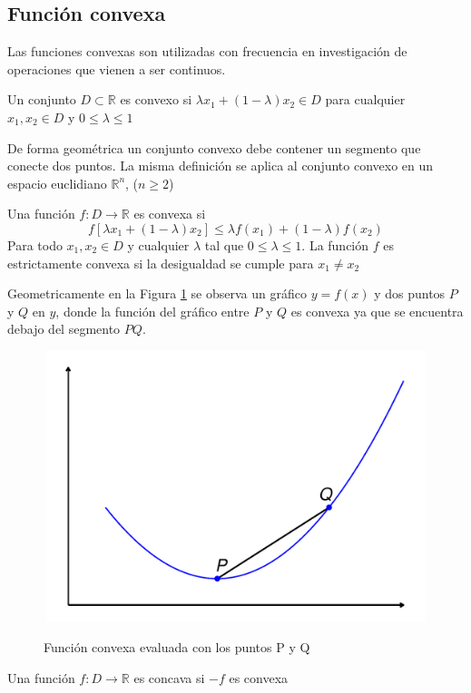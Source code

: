 \subsection{Función convexa}
Las funciones convexas son utilizadas con frecuencia en investigación de operaciones que vienen a ser continuos. \citep{Khuri_2002} 
\begin{definition}
	Un conjunto $D \subset \mathbb{R}$ es convexo si $\lambda {x}_{1}+(1-\lambda){x}_{2} \in D$ para cualquier ${x}_{1},{x}_{2} \in D$ y $0 \leq \lambda \leq 1$
\end{definition}
De forma geométrica un conjunto convexo debe contener un segmento que conecte dos puntos. La misma definición se aplica al conjunto convexo en un espacio euclidiano $\mathbb{R}^n$, ($n \geq 2$)
\begin{definition}
	Una función $f: D \rightarrow \mathbb{R}$ es convexa si
	$$
	f[ \lambda {x}_{1} + (1 - \lambda) {x}_{2} ] \leq \lambda f({x}_{1}) + (1 - \lambda)f({x}_{2})
	$$
	Para todo ${x}_{1}, {x}_{2} \in D$ y cualquier $\lambda$ tal que $0 \leq \lambda \leq 1$. La función $f$ es estrictamente convexa si la desigualdad se cumple para ${x}_{1} \neq {x}_{2}$
\end{definition}
Geometricamente en la Figura \ref{fig:convexo} se observa un gráfico $y = f(x)$ y dos puntos $P$ y $Q$ en $y$, donde la función del gráfico entre $P$ y $Q$ es convexa ya que se encuentra debajo del segmento $PQ$.
\begin{figure}[H]
  \caption{Función convexa evaluada con los puntos P y Q}
  {\includegraphics[width=15cm, height=7.9cm]{images/convexo.pdf}}
  \label{fig:convexo}
\end{figure}

\begin{definition}
	Una función $f: D \rightarrow \mathbb{R}$ es concava si $-f$ es convexa
\end{definition}

